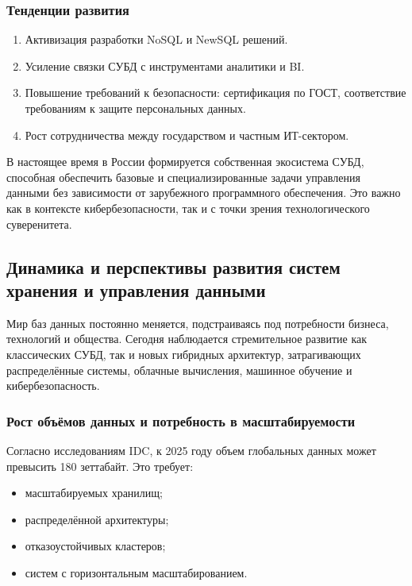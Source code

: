 \subsubsection{Тенденции развития}

\begin{enumerate}
	\item Активизация разработки NoSQL и NewSQL решений.
	\item Усиление связки СУБД с инструментами аналитики и BI.
	\item Повышение требований к безопасности: сертификация по ГОСТ, соответствие требованиям к защите персональных данных.
	\item Рост сотрудничества между государством и частным ИТ-сектором.	
\end{enumerate}

В настоящее время в России формируется собственная экосистема СУБД, способная обеспечить базовые и специализированные задачи управления данными без зависимости от зарубежного программного обеспечения. Это важно как в контексте кибербезопасности, так и с точки зрения технологического суверенитета.

\subsection{Динамика и перспективы развития систем хранения и управления данными}

Мир баз данных постоянно меняется, подстраиваясь под потребности бизнеса, технологий и общества. Сегодня наблюдается стремительное развитие как классических СУБД, так и новых гибридных архитектур, затрагивающих распределённые системы, облачные вычисления, машинное обучение и кибербезопасность.

\subsubsection{Рост объёмов данных и потребность в масштабируемости}

Согласно исследованиям IDC, к 2025 году объем глобальных данных может превысить 180 зеттабайт. Это требует:
\begin{itemize}
	\item масштабируемых хранилищ;
	\item распределённой архитектуры;
	\item отказоустойчивых кластеров;
	\item систем с горизонтальным масштабированием.
\end{itemize}

